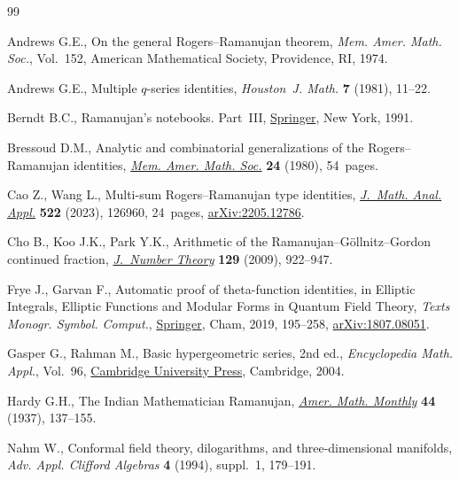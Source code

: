 \documentclass[pdftex]{sigma}
\numberwithin{equation}{section}
\theoremstyle{definition}
\begin{document}
\begin{thebibliography}{99}
\footnotesize\itemsep=0pt

Andrews G.E., On the general {R}ogers--{R}amanujan theorem, \textit{Mem. Amer.
 Math. Soc.}, Vol.~152, American Mathematical Society, Providence, RI, 1974.

Andrews G.E., Multiple {$q$}-series identities, \textit{Houston~J. Math.}
 \textbf{7} (1981), 11--22.

Berndt B.C., Ramanujan's notebooks. {P}art~{III},
 \href{https://doi.org/10.1007/978-1-4612-0965-2}{Springer}, New York, 1991.

Bressoud D.M., Analytic and combinatorial generalizations of the
 {R}ogers--{R}amanujan identities,
 \href{https://doi.org/10.1090/memo/0227}{\textit{Mem. Amer. Math. Soc.}}
 \textbf{24} (1980), 54~pages.

Cao Z., Wang L., Multi-sum {R}ogers--{R}amanujan type identities,
 \href{https://doi.org/10.1016/j.jmaa.2022.126960}{\textit{J.~Math. Anal.
 Appl.}} \textbf{522} (2023), 126960, 24~pages,
 \href{http://arxiv.org/abs/2205.12786}{arXiv:2205.12786}.

Cho B., Koo J.K., Park Y.K., Arithmetic of the
 {R}amanujan--{G}\"{o}llnitz--{G}ordon continued fraction,
 \href{https://doi.org/10.1016/j.jnt.2008.09.018}{\textit{J.~Number Theory}}
 \textbf{129} (2009), 922--947.

Frye J., Garvan F., Automatic proof of theta-function identities, in Elliptic Integrals, Elliptic Functions and Modular Forms in Quantum Field Theory,
 \textit{Texts Monogr. Symbol. Comput.},
 \href{https://doi.org/10.1007/978-3-030-04480-0_10}{Springer}, Cham, 2019,
 195--258, \href{http://arxiv.org/abs/1807.08051}{arXiv:1807.08051}.

Gasper G., Rahman M., Basic hypergeometric series, 2nd ed., \textit{Encyclopedia Math.
 Appl.}, Vol.~96,
 \href{https://doi.org/10.1017/CBO9780511526251}{Cambridge University Press},
 Cambridge, 2004.

Hardy G.H., The {I}ndian {M}athematician {R}amanujan,
 \href{https://doi.org/10.2307/2301659}{\textit{Amer. Math. Monthly}}
 \textbf{44} (1937), 137--155.

Nahm W., Conformal field theory, dilogarithms, and three-dimensional manifolds,
 \textit{Adv. Appl. Clifford Algebras} \textbf{4} (1994), suppl.~1, 179--191.


\end{thebibliography}
\end{document}
